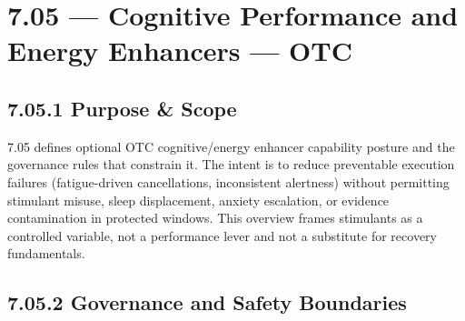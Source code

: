 \documentclass[10pt]{article}
\begin{document}
\section*{7.05 — Cognitive Performance and Energy Enhancers — OTC}
{}

\subsection*{7.05.1 Purpose \& Scope}
{}

7.05 defines optional OTC cognitive/energy enhancer capability posture and the governance rules that constrain it. The intent is to reduce preventable execution failures (fatigue-driven cancellations, inconsistent alertness) without permitting stimulant misuse, sleep displacement, anxiety escalation, or evidence contamination in protected windows. This overview frames stimulants as a controlled variable, not a performance lever and not a substitute for recovery fundamentals.

\subsection*{7.05.2 Governance and Safety Boundaries}
{}
\end{document}
